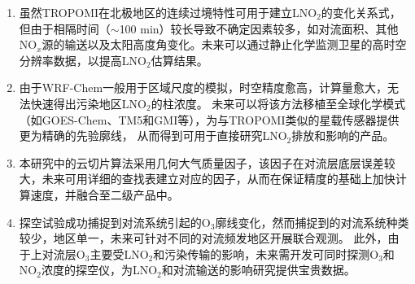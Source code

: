 \begin{enumerate}[label=(\arabic*), labelindent=\parindent, leftmargin=0pt, widest=0, itemindent=*, topsep=0pt, partopsep=0pt, parsep=0pt]

\item 虽然TROPOMI在北极地区的连续过境特性可用于建立LNO$_2$的变化关系式，但由于相隔时间（$\sim$100 min）较长导致不确定因素较多，如对流面积、其他NO$_x$源的输送以及太阳高度角变化。未来可以通过静止化学监测卫星的高时空分辨率数据，以提高LNO$_2$估算结果。

\item 由于WRF-Chem一般用于区域尺度的模拟，时空精度愈高，计算量愈大，无法快速得出污染地区LNO$_2$的柱浓度。
未来可以将该方法移植至全球化学模式（如GOES-Chem、TM5和GMI等），为与TROPOMI类似的星载传感器提供更为精确的先验廓线，
从而得到可用于直接研究LNO$_2$排放和影响的产品。

\item 本研究中的云切片算法采用几何大气质量因子，该因子在对流层底层误差较大，未来可用详细的查找表建立对应的因子，从而在保证精度的基础上加快计算速度，并融合至二级产品中。

\item 探空试验成功捕捉到对流系统引起的O$_3$廓线变化，然而捕捉到的对流系统种类较少，地区单一，未来可针对不同的对流频发地区开展联合观测。
此外，由于上对流层O$_3$主要受LNO$_2$和污染传输的影响，未来需开发可同时探测O$_3$和NO$_2$浓度的探空仪，为LNO$_2$和对流输送的影响研究提供宝贵数据。

\end{enumerate}

